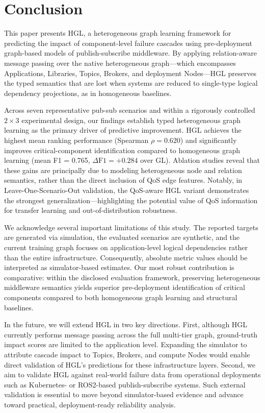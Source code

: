 \documentclass[sigconf,9pt,anonymous]{acmart}
\begin{document}
\section{Conclusion}

This paper presents HGL, a heterogeneous graph learning framework for predicting the impact of component-level failure cascades using pre-deployment graph-based models of publish-subscribe middleware. By applying relation-aware message passing over the native heterogeneous graph—which encompasses Applications, Libraries, Topics, Brokers, and deployment Nodes—HGL preserves the typed semantics that are lost when systems are reduced to single-type logical dependency projections, as in homogeneous baselines.

Across seven representative pub-sub scenarios and within a rigorously controlled $2\times3$ experimental design, our findings establish typed heterogeneous graph learning as the primary driver of predictive improvement. HGL achieves the highest mean ranking performance (Spearman $\rho=0.620$) and significantly improves critical-component identification compared to homogeneous graph learning (mean F1 = 0.765, $\Delta\text{F1}=+0.284$ over GL). Ablation studies reveal that these gains are principally due to modeling heterogeneous node and relation semantics, rather than the direct inclusion of QoS edge features. Notably, in Leave-One-Scenario-Out validation, the QoS-aware HGL variant demonstrates the strongest generalization—highlighting the potential value of QoS information for transfer learning and out-of-distribution robustness.

We acknowledge several important limitations of this study. The reported targets are generated via simulation, the evaluated scenarios are synthetic, and the current training graph focuses on application-level logical dependencies rather than the entire infrastructure. Consequently, absolute metric values should be interpreted as simulator-based estimates. Our most robust contribution is comparative: within the disclosed evaluation framework, preserving heterogeneous middleware semantics yields superior pre-deployment identification of critical components compared to both homogeneous graph learning and structural baselines.

In the future, we will extend HGL in two key directions. First, although HGL currently performs message passing across the full multi-tier graph, ground-truth impact scores are limited to the application level. Expanding the simulator to attribute cascade impact to Topics, Brokers, and compute Nodes would enable direct validation of HGL's predictions for these infrastructure layers. Second, we aim to validate HGL against real-world failure data from operational deployments such as Kubernetes- or ROS2-based publish-subscribe systems. Such external validation is essential to move beyond simulator-based evidence and advance toward practical, deployment-ready reliability analysis.
\end{document}
